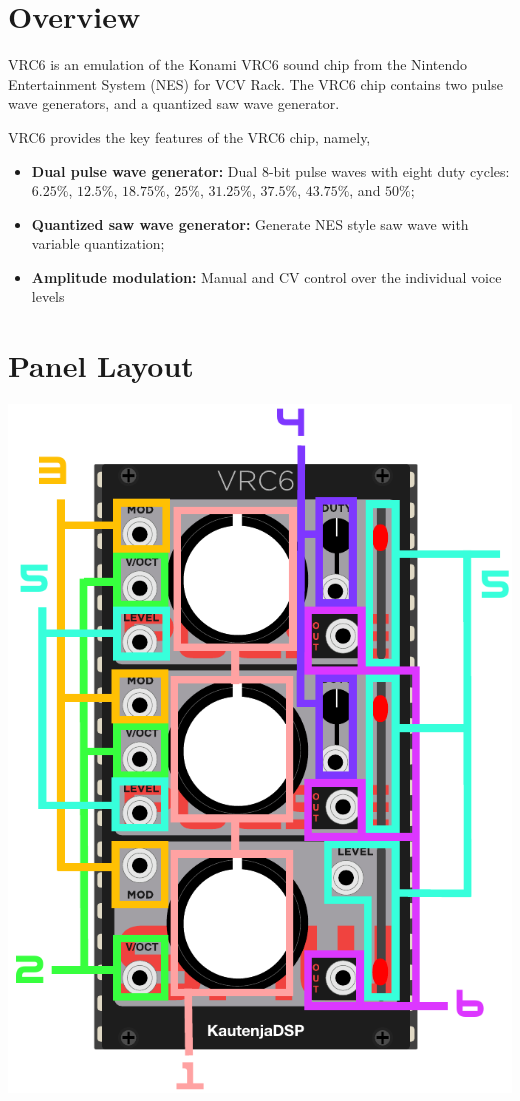 \documentclass[12pt,a4paper]{article}
\begin{document}

\section{Overview}

VRC6 is an emulation of the Konami VRC6 sound chip from the Nintendo Entertainment System (NES) for VCV Rack. The VRC6 chip contains two pulse wave generators, and a quantized saw wave generator.

VRC6 provides the key features of the VRC6 chip, namely,
\begin{itemize}
  \item \textbf{Dual pulse wave generator:} Dual 8-bit pulse waves with eight duty cycles: $6.25\%$, $12.5\%$, $18.75\%$, $25\%$, $31.25\%$, $37.5\%$, $43.75\%$, and $50\%$;
  \item \textbf{Quantized saw wave generator:} Generate NES style saw wave with variable quantization;
  \item \textbf{Amplitude modulation:} Manual and CV control over the individual voice levels
\end{itemize}


\section{Panel Layout}

\begin{center}
\includegraphics{VRC6-Manual}
\end{center}
\end{document}
